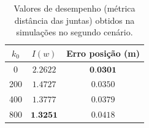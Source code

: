 \begin{table}[htbp]
    \centering
    \begin{tabular}{ccc}
        \toprule
        \( k_0 \) & \( I(w) \) & Erro posição (m) \\
        \midrule
        0  & \( 2.2622 \) & \( \textbf{0.0301} \) \\
        200  & \( 1.4727 \) & \( 0.0350 \) \\
        400  & \( 1.3777 \) & \( 0.0379 \) \\
        800  & \( \textbf{1.3251} \) & \( 0.0418 \) \\
        \bottomrule
    \end{tabular}
    \caption{Valores de desempenho (métrica distância das juntas) obtidos na simulações no segundo cenário.}
    \label{tab:scores-exp3}
\end{table}
